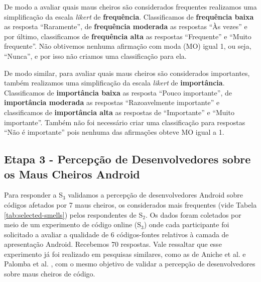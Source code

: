 De modo a avaliar quais maus cheiros são considerados frequentes realizamos uma simplificação da escala \textit{likert} de \textbf{\small frequência}. Classificamos de \textbf{\small frequência baixa} as resposta ``Raramente'', de \textbf{\small frequência moderada} as respostas ``Às vezes'' e por último, classificamos de \textbf{\small frequência alta} as respostas ``Frequente'' e ``Muito frequente''. Não obtivemos nenhuma afirmação com moda (MO) igual 1, ou seja, ``Nunca'', e por isso não criamos uma classificação para ela.

De modo similar, para avaliar quais maus cheiros são considerados importantes, também realizamos uma simplificação da escala \textit{likert} de \textbf{\small importância}. Classificamos de \textbf{\small importância baixa} as resposta ``Pouco importante'', de \textbf{\small importância moderada} as respostas ``Razoavelmente importante'' e classificamos de \textbf{\small importância alta} as respostas de ``Importante'' e ``Muito importante''. Também não foi necessário criar uma classificação para respostas ``Não é importante'' pois nenhuma das afirmações obteve MO igual a 1.















\subsection[Etapa 3 - Percepção de Desenvolvedores sobre os Maus Cheiros]{Etapa 3 - Percepção de Desenvolvedores sobre os Maus Cheiros Android}
\label{etapa-3}

Para responder a S$_3$ validamos a percepção de desenvolvedores Android sobre códigos afetados por 7 maus cheiros, os considerados mais frequentes (vide Tabela \ref{tab:selected-smells}) pelos respondentes de S$_2$. Os dados foram coletados por meio de um experimento de código online (S$_3$) onde cada participante foi solicitado a avaliar a qualidade de 6 códigos-fontes relativos à camada de apresentação Android. Recebemos 70 respostas. Vale ressaltar que esse experimento já foi realizado em pesquisas similares, como as de Aniche et al. \cite{AnicheSmellsMVC:17, MvcSmells:16} e Palomba et al. \cite{Palomba_Do_2014}, com o mesmo objetivo de validar a percepção de desenvolvedores sobre maus cheiros de código.  


